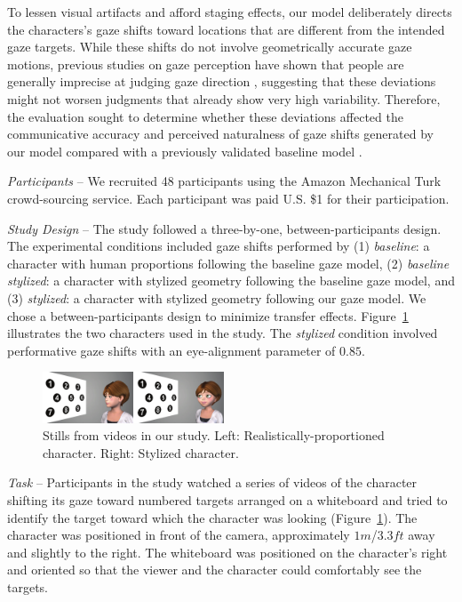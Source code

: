 To lessen visual artifacts and afford staging effects, our model deliberately directs the characters's gaze shifts toward locations that are different from the intended gaze targets. While these shifts do not involve geometrically accurate gaze motions, previous studies on gaze perception have shown that people are generally imprecise at judging gaze direction \cite{argyle1976gaze}, suggesting that these deviations might not worsen judgments that already show very high variability. Therefore, the evaluation sought to determine whether these deviations affected the communicative accuracy and perceived naturalness of gaze shifts generated by our model compared with a previously validated baseline model \cite{andrist2012headeye}.

\textit{Participants} -- We recruited 48 participants using the Amazon Mechanical Turk crowd-sourcing service. Each participant was paid U.S. \$1 for their participation.

\textit{Study Design} -- The study followed a three-by-one, between-participants design. The experimental conditions included gaze shifts performed by (1) \textit{baseline}: a character with human proportions following the baseline gaze model, (2) \textit{baseline stylized}: a character with stylized geometry following the baseline gaze model, and (3) \textit{stylized}: a character with stylized geometry following our gaze model. We chose a between-participants design to minimize transfer effects. Figure~\ref{fig:StudyTask} illustrates the two characters used in the study. The \textit{stylized} condition involved performative gaze shifts with an eye-alignment parameter of $0.85$.

\begin{figure}[t]
\centering
\includegraphics[width=0.48\textwidth]{Figures/StudyTask-small.pdf}
\caption{Stills from videos in our study. Left: Realistically-proportioned character. Right: Stylized character.}
\vspace{-12pt}
\label{fig:StudyTask}
\end{figure}

\textit{Task} -- Participants in the study watched a series of videos of the character shifting its gaze toward numbered targets arranged on a whiteboard and tried to identify the target toward which the character was looking (Figure~\ref{fig:StudyTask}). The character was positioned in front of the camera, approximately $1 m$/$3.3 ft$ away and slightly to the right. The whiteboard was positioned on the character's right and oriented so that the viewer and the character could comfortably see the targets.

